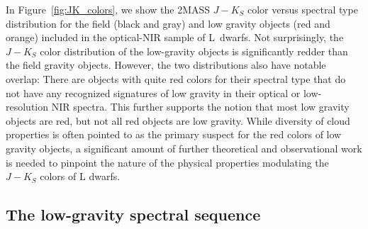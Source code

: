 \documentclass[12pt,preprint]{aastex}
\begin{document}
In Figure~\ref{fig:JK_colors}, we show the 2MASS $J-K_S$ color versus spectral type distribution for the field (black and gray) and low gravity objects (red and orange) included in the optical-NIR sample of L~dwarfs.
Not surprisingly, the $J-K_S$ color distribution of the low-gravity objects is significantly redder than the field gravity objects. 
However, the two distributions also have notable overlap: There are objects with quite red colors for their spectral type that do not have any recognized signatures of low gravity in their optical or low-resolution NIR spectra.
This further supports the notion that most low gravity objects are red, but not all red objects are low gravity.
While diversity of cloud properties is often pointed to as the primary suspect for the red colors of low gravity objects, a significant amount of further theoretical and observational work is needed to pinpoint the nature of the physical properties modulating the $J-K_S$ colors of L dwarfs.

\subsection{The low-gravity spectral sequence}
\end{document}
